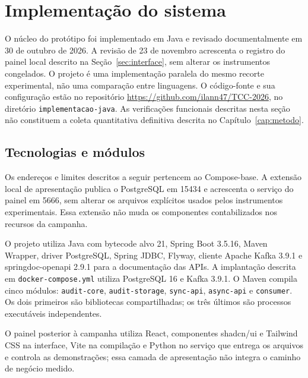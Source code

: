 \section{Implementação do sistema}
\label{sec:implementacao-real}
O núcleo do protótipo foi implementado em Java e revisado documentalmente em 30 de outubro de 2026. A revisão de 23 de novembro acrescenta o registro do painel local descrito na Seção~\ref{sec:interface}, sem alterar os instrumentos congelados. O projeto é uma implementação paralela do mesmo recorte experimental, não uma comparação entre linguagens. O código-fonte e sua configuração estão no repositório \url{https://github.com/ilann47/TCC-2026}, no diretório \texttt{implementacao-java}. As verificações funcionais descritas nesta seção não constituem a coleta quantitativa definitiva descrita no Capítulo~\ref{cap:metodo}.

\subsection{Tecnologias e módulos}
Os endereços e limites descritos a seguir pertencem ao Compose-base. A extensão local de apresentação publica o PostgreSQL em 15434 e acrescenta o serviço do painel em 5666, sem alterar os arquivos explícitos usados pelos instrumentos experimentais. Essa extensão não muda os componentes contabilizados nos recursos da campanha.

O projeto utiliza Java com bytecode alvo 21, Spring Boot 3.5.16, Maven Wrapper, driver PostgreSQL, Spring JDBC, Flyway, cliente Apache Kafka 3.9.1 e springdoc-openapi 2.9.1 para a documentação das APIs. A implantação descrita em \texttt{docker-compose.yml} utiliza PostgreSQL 16 e Kafka 3.9.1. O Maven compila cinco módulos: \texttt{audit-core}, \texttt{audit-storage}, \texttt{sync-api}, \texttt{async-api} e \texttt{consumer}. Os dois primeiros são bibliotecas compartilhadas; os três últimos são processos executáveis independentes.

O painel posterior à campanha utiliza React, componentes shadcn/ui e Tailwind CSS na interface, Vite na compilação e Python no serviço que entrega os arquivos e controla as demonstrações; essa camada de apresentação não integra o caminho de negócio medido.

